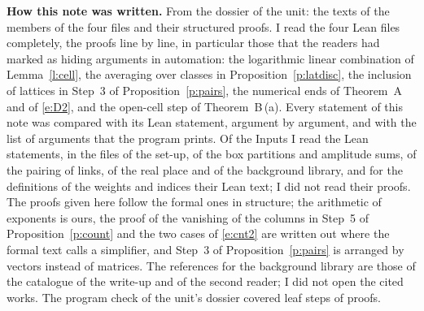 \documentclass[11pt,a4paper]{article}
\newcommand{\subhead}[1]{\par\addvspace{9pt plus 2pt}\Needspace{4\baselineskip}\noindent\textbf{#1}\enspace\ignorespaces}
\theoremstyle{plainx}
\theoremstyle{uprightx}
\begin{document}
\subhead{How this note was written.} From the dossier of the unit: the texts of the members of the four files and
their structured proofs. I read the four Lean files completely, the proofs line by line, in particular those
that the readers had marked as hiding arguments in automation: the logarithmic linear combination of
Lemma~\ref{l:cell}, the averaging over classes in Proposition~\ref{p:latdisc}, the inclusion of lattices in Step~3
of Proposition~\ref{p:pairs}, the numerical ends of Theorem~A and of \eqref{e:D2}, and the open-cell step of
Theorem~B\,(a). Every statement of this note was compared with its Lean statement, argument by argument, and with
the list of arguments that the program prints. Of the Inputs I read the Lean statements, in the files of the
set-up, of the box partitions and amplitude sums, of the pairing of links, of the real place and of the
background library, and for the definitions of the weights and indices their Lean text; I did not read their
proofs. The proofs given here follow the formal ones in structure; the arithmetic of exponents is ours, the
proof of the vanishing of the columns in Step~5 of Proposition~\ref{p:count} and the two cases of
\eqref{e:cnt2} are written out where the formal text calls a simplifier, and Step~3 of
Proposition~\ref{p:pairs} is arranged by vectors instead of matrices. The references for the background library
are those of the catalogue of the write-up and of the second reader; I did not open the cited works. The
program check of the unit's dossier covered \UnitSteps{} leaf steps of \UnitProofs{} proofs.
\end{document}
